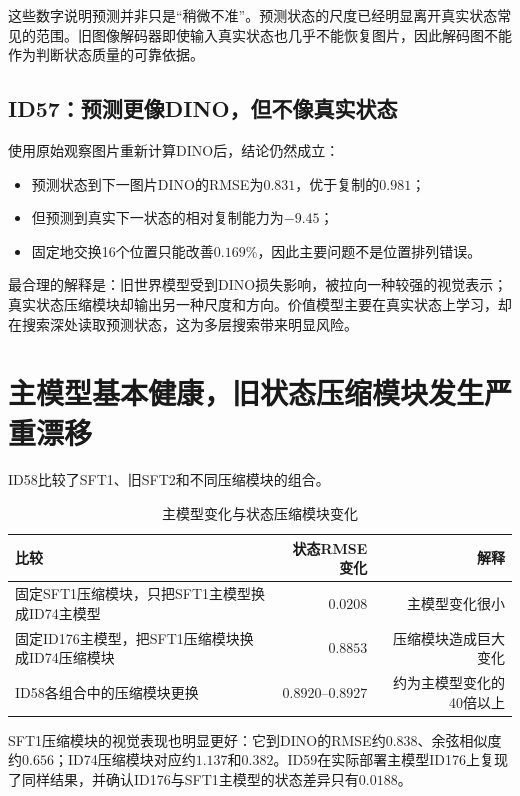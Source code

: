 \documentclass[UTF8,11pt,a4paper,fontset=none]{ctexart}
\begin{document}
这些数字说明预测并非只是“稍微不准”。预测状态的尺度已经明显离开真实状态常见的范围。旧图像解码器即使输入真实状态也几乎不能恢复图片，因此解码图不能作为判断状态质量的可靠依据。

\subsection{ID57：预测更像DINO，但不像真实状态}

使用原始观察图片重新计算DINO后，结论仍然成立：

\begin{itemize}
  \item 预测状态到下一图片DINO的RMSE为$0.831$，优于复制的$0.981$；
  \item 但预测到真实下一状态的相对复制能力为$-9.45$；
  \item 固定地交换16个位置只能改善$0.169\%$，因此主要问题不是位置排列错误。
\end{itemize}

最合理的解释是：旧世界模型受到DINO损失影响，被拉向一种较强的视觉表示；真实状态压缩模块却输出另一种尺度和方向。价值模型主要在真实状态上学习，却在搜索深处读取预测状态，这为多层搜索带来明显风险。

\section{主模型基本健康，旧状态压缩模块发生严重漂移}

ID58比较了SFT1、旧SFT2和不同压缩模块的组合。

\begin{table}[htbp]
\centering
\caption{主模型变化与状态压缩模块变化}
\small
\begin{tabularx}{\textwidth}{Xrr}
\toprule
\textbf{比较} & \textbf{状态RMSE变化} & \textbf{解释} \\
\midrule
固定SFT1压缩模块，只把SFT1主模型换成ID74主模型 & $0.0208$ & 主模型变化很小 \\
固定ID176主模型，把SFT1压缩模块换成ID74压缩模块 & $0.8853$ & 压缩模块造成巨大变化 \\
ID58各组合中的压缩模块更换 & $0.8920$--$0.8927$ & 约为主模型变化的40倍以上 \\
\bottomrule
\end{tabularx}
\end{table}

SFT1压缩模块的视觉表现也明显更好：它到DINO的RMSE约$0.838$、余弦相似度约$0.656$；ID74压缩模块对应约$1.137$和$0.382$。ID59在实际部署主模型ID176上复现了同样结果，并确认ID176与SFT1主模型的状态差异只有$0.0188$。
\end{document}
